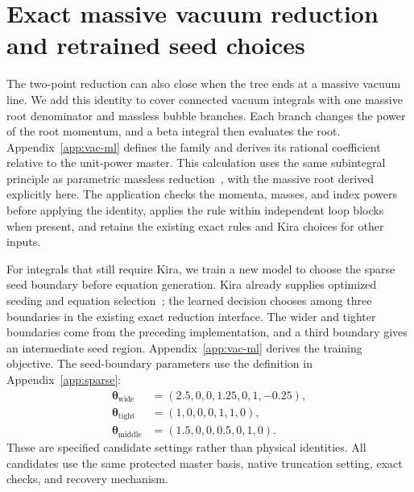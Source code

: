 \section{Exact massive vacuum reduction and retrained seed choices}
\label{sec:vac-ml}
The two-point reduction can also close when the tree ends at a massive vacuum line. We add this identity to cover connected vacuum integrals with one massive root denominator and massless bubble branches. Each branch changes the power of the root momentum, and a beta integral then evaluates the root. Appendix~\ref{app:vac-ml} defines the family and derives its rational coefficient relative to the unit-power master. This calculation uses the same subintegral principle as parametric massless reduction~\cite{Ruijl2017Forcer}, with the massive root derived explicitly here. The application checks the momenta, masses, and index powers before applying the identity, applies the rule within independent loop blocks when present, and retains the existing exact rules and Kira choices for other inputs.

For integrals that still require Kira, we train a new model to choose the sparse seed boundary before equation generation. Kira already supplies optimized seeding and equation selection~\cite{Kira3}; the learned decision chooses among three boundaries in the existing exact reduction interface. The wider and tighter boundaries come from the preceding implementation, and a third boundary gives an intermediate seed region. Appendix~\ref{app:vac-ml} derives the training objective. The seed-boundary parameters use the definition in Appendix~\ref{app:sparse}:
\begin{equation}
 \begin{split}
 \boldsymbol\theta_{\mathrm{wide}}&=(2.5,0,0,1.25,0,1,-0.25),\\
 \boldsymbol\theta_{\mathrm{tight}}&=(1,0,0,0,1,1,0),\\
 \boldsymbol\theta_{\mathrm{middle}}&=(1.5,0,0,0.5,0,1,0).
 \end{split}
 \label{eq:vac-ml-choices}
\end{equation}
These are specified candidate settings rather than physical identities. All candidates use the same protected master basis, native truncation setting, exact checks, and recovery mechanism.

